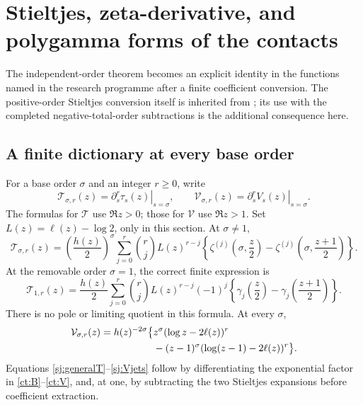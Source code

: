 \section{Stieltjes, zeta-derivative, and polygamma forms of the contacts}
\label{sj:section}

The independent-order theorem becomes an explicit identity in the
functions named in the research programme after a finite coefficient
conversion. The positive-order Stieltjes conversion itself is inherited
from \cite{ProveItBilinear}; its use with the completed negative-total-order
subtractions is the additional consequence here.

\subsection{A finite dictionary at every base order}

For a base order \(\sigma\) and an integer \(r\ge0\), write
\[
 \mathcal T_{\sigma,r}(z)
   =\left.\partial_s^r\tau_s(z)\right|_{s=\sigma},
 \qquad
 \mathcal V_{\sigma,r}(z)
   =\left.\partial_s^rV_s(z)\right|_{s=\sigma}.
\]
The formulas for \(\mathcal T\) use \(\Re z>0\); those for
\(\mathcal V\) use \(\Re z>1\).
Set \(L(z)=\ell(z)-\log2\), only in this section. At \(\sigma\ne1\),
\begin{equation}\label{sj:generalT}
 \mathcal T_{\sigma,r}(z)
 =\left(\frac{h(z)}2\right)^\sigma
  \sum_{j=0}^r\binom rj L(z)^{r-j}
  \left\{\zeta^{(j)}\!\left(\sigma,\frac z2\right)
        -\zeta^{(j)}\!\left(\sigma,\frac{z+1}{2}\right)\right\}.
\end{equation}
At the removable order \(\sigma=1\), the correct finite expression is
\begin{equation}\label{sj:stieltjesT}
 \mathcal T_{1,r}(z)=\frac{h(z)}2
  \sum_{j=0}^r\binom rj L(z)^{r-j}(-1)^j
  \left\{\gamma_j\!\left(\frac z2\right)
        -\gamma_j\!\left(\frac{z+1}{2}\right)\right\}.
\end{equation}
There is no pole or limiting quotient in this formula. At every \(\sigma\),
\begin{align}
 \mathcal V_{\sigma,r}(z)
 =h(z)^{-2\sigma}\bigl\{
 &z^\sigma(\log z-2\ell(z))^r \notag\\
 &-(z-1)^\sigma(\log(z-1)-2\ell(z))^r\bigr\}.
 \label{sj:Vjets}
\end{align}
Equations \eqref{sj:generalT}--\eqref{sj:Vjets} follow by differentiating
the exponential factor in \eqref{ct:B}--\eqref{ct:V}, and, at one, by
subtracting the two Stieltjes expansions before coefficient extraction.

